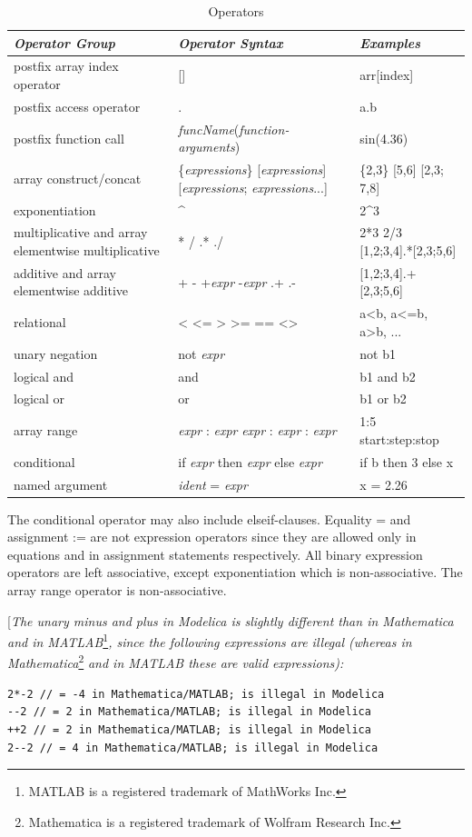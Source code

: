 \documentclass[10pt,a4paper]{report}
\begin{document}
\begin{table}
\caption{Operators}
\begin{tabular}{|p{3cm}|p{4cm}|p{4cm}|}
\hline
\emph{Operator Group} & \emph{Operator Syntax} & \emph{Examples} \\ \hline 
postfix array index operator & {[}{]} & arr{[}index{]} \\ \hline
postfix access operator & . & a.b \\ \hline
postfix function call & \emph{funcName}(\emph{function-arguments}) & sin(4.36)\\ \hline
array construct/concat & \{\emph{expressions}\} {[}\emph{expressions}{]} {[}\emph{expressions}; \emph{expressions}...{]} & \{2,3\} {[}5,6{]}
{[}2,3; 7,8{]}\\ \hline
exponentiation & \^{} & 2\^{}3\\ \hline
multiplicative and array elementwise multiplicative & * / .* ./ & 2*3 2/3 {[}1,2;3,4{]}.*{[}2,3;5,6{]} \\ \hline
additive and array elementwise additive & + - +\emph{expr} -\emph{expr} .+ .- & {[}1,2;3,4{]}.+{[}2,3;5,6{]}\\ \hline
relational & \textless{} \textless{}= \textgreater{} \textgreater{}= == \textless{}\textgreater{} & 
a\textless{}b, a\textless{}=b, a\textgreater{}b, ...\\ \hline
unary negation & not \emph{expr} & not b1\\ \hline
logical and & and & b1 and b2\\ \hline
logical or & or & b1 or b2\\ \hline
array range & \emph{expr} : \emph{expr}
\emph{expr} : \emph{expr} : \emph{expr} & 1:5
start:step:stop\\ \hline
conditional & if \emph{expr} then \emph{expr} else \emph{expr} & if b
then 3 else x\\ \hline
named argument & \emph{ident} = \emph{expr} & x = 2.26\\ \hline
\end{tabular}
\end{table}

The conditional operator may also include elseif-clauses. Equality = and
assignment := are not expression operators since they are allowed only
in equations and in assignment statements respectively. All binary
expression operators are left associative, except exponentiation which
is non-associative. The array range operator is non-associative.

{[}\emph{The unary minus and plus in Modelica is slightly different than
in Mathematica and in MATLAB}\footnote{MATLAB is a registered trademark
  of MathWorks Inc.}\emph{, since the following expressions are illegal
(whereas in Mathematica}\footnote{Mathematica is a registered trademark
  of Wolfram Research Inc.} \emph{and in MATLAB these are valid
expressions):}
\begin{lstlisting}[language=modelica]
2*-2 // = -4 in Mathematica/MATLAB; is illegal in Modelica
--2 // = 2 in Mathematica/MATLAB; is illegal in Modelica
++2 // = 2 in Mathematica/MATLAB; is illegal in Modelica
2--2 // = 4 in Mathematica/MATLAB; is illegal in Modelica
\end{lstlisting}
\end{document}

